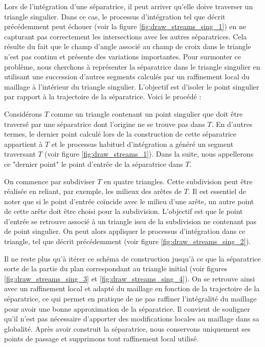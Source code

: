 Lors de l'intégration d'une séparatrice, il peut arriver qu'elle doive traverser un triangle singulier. Dans ce cas, le processus d'intégration tel que décrit précédemment peut échouer (voir la figure \ref{fig:draw_streams_sing_1}) en ne capturant pas correctement les intersections avec les autres séparatrices. Cela résulte du fait que le champ d'angle associé au champ de croix dans le triangle n'est pas continu et présente des variations importantes. Pour surmonter ce problème, nous cherchons à représenter la séparatrice dans le triangle singulier en utilisant une succession d'autres segments calculés par un raffinement local du maillage à l'intérieur du triangle singulier. L'objectif est d'isoler le point singulier par rapport à la trajectoire de la séparatrice. Voici le procédé :

Considérons $T$ comme un triangle contenant un point singulier que doit être traversé par une séparatrice dont l'origine ne se trouve pas dans $T$. En d'autres termes, le dernier point calculé lors de la construction de cette séparatrice appartient à $T$ et le processus habituel d'intégration a généré un segment traversant $T$ (voir figure \ref{fig:draw_streams_1}). Dans la suite, nous appellerons ce "dernier point" le point d'entrée de la séparatrice dans $T$.

On commence par subdiviser $T$ en quatre triangles. Cette subdivision peut être réalisée en reliant, par exemple, les milieux des arêtes de $T$. Il est essentiel de noter que si le point d'entrée coïncide avec le milieu d'une arête, un autre point de cette arête doit être choisi pour la subdivision. L'objectif est que le point d'entrée se retrouve associé à un triangle issu de la subdivision ne contenant pas de point singulier. On peut alors appliquer le processus d'intégration dans ce triangle, tel que décrit précédemment (voir figure \ref{fig:draw_streams_sing_2}).

Il ne reste plus qu'à itérer ce schéma de construction jusqu'à ce que la séparatrice sorte de la partie du plan correspondant au triangle initial (voir figures \ref{fig:draw_streams_sing_3} et \ref{fig:draw_streams_sing_4}). On se retrouve ainsi avec un raffinement local et adapté du maillage en fonction de la trajectoire de la séparatrice, ce qui permet en pratique de ne pas raffiner l'intégralité du maillage pour avoir une bonne approximation de la séparatrice. Il convient de souligner qu'il n'est pas nécessaire d'apporter des modifications locales au maillage dans sa globalité. Après avoir construit la séparatrice, nous conservons uniquement ses points de passage et supprimons tout raffinement local utilisé.

